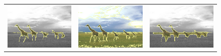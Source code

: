 \documentclass[smallextended]{svjour3}       %
\begin{document}
{{\begin{figure}[hp!]
\begin{tabular}{ccc}
		\includegraphics[scale=0.2]{segmentation_bc_giraffes_gc-seg.png} &
		\includegraphics[scale=0.2]{segmentation_schoenemann_giraffes_giraffes-seg.png} &
		\includegraphics[scale=0.2]{segmentation_bc_giraffes_corrected-seg.png} \\		

\end{tabular}
\end{figure}}}
\end{document}
